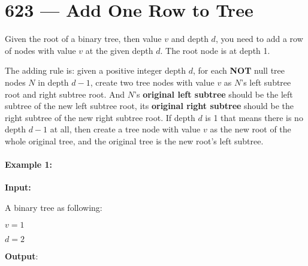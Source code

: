 \section{623 --- Add One Row to Tree}
Given the root of a binary tree, then value $v$ and depth $d$, you need to add a row of nodes with value $v$ at the given depth $d$. The root node is at depth 1.

The adding rule is: given a positive integer depth $d$, for each \textbf{NOT} null tree nodes $N$ in depth $d-1$, create two tree nodes with value $v$ as $N$'s left subtree root and right subtree root. And $N$'s \textbf{original left subtree} should be the left subtree of the new left subtree root, its \textbf{original right subtree} should be the right subtree of the new right subtree root. If depth $d$ is 1 that means there is no depth $d-1$ at all, then create a tree node with value $v$ as the new root of the whole original tree, and the original tree is the new root's left subtree.

\paragraph{Example 1:}
\begin{flushleft}
\textbf{Input:}

A binary tree as following:
\begin{figure}[H]
\end{figure}

$v = 1$

$d = 2$

\textbf{Output}:
\begin{figure}[H]
\end{figure}

\end{flushleft}
 
